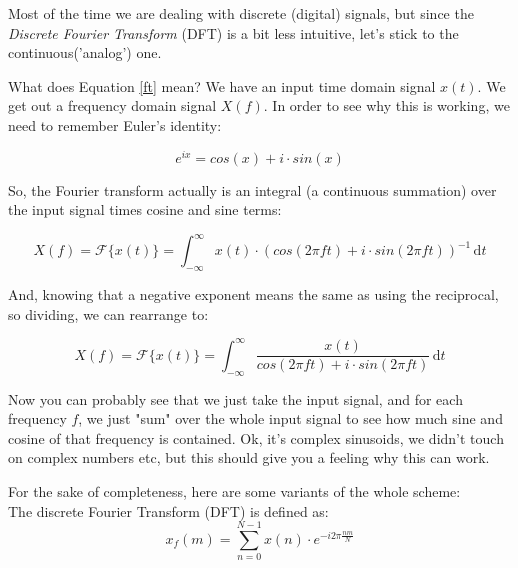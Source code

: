 Most of the time we are dealing with discrete (digital) signals, but since the  \textit{Discrete Fourier Transform} (DFT) is a bit less intuitive, let's stick to the continuous('analog') one.


What does Equation \ref{ft} mean? We have an input time domain signal $x(t)$. We get out a frequency domain signal $X(f)$. In order to see why this is working, we need to remember Euler's identity:

\begin{equation}
	e ^{ix} = cos(x)+i \cdot sin(x)
\end{equation}

So, the Fourier transform actually is an integral (a continuous summation) over the input signal times cosine and sine terms:


\begin{equation}
	X(f)= \mathcal{F} \{x(t)\} = \int_{-\infty}^\infty \! x(t) \cdot (cos(2\pi ft)+i \cdot sin(2\pi ft) )^{-1}  \, \mathrm{d}t
	\label{ft2}
\end{equation}

And, knowing that a negative exponent means the same as using the reciprocal, so dividing, we can rearrange to:


\begin{equation}
	X(f)= \mathcal{F} \{x(t)\} = \int_{-\infty}^\infty \! \frac{x(t)} { cos(2\pi ft)+i \cdot sin(2\pi ft) }  \, \mathrm{d}t
	\label{ft2}
\end{equation}

Now you can probably see that we just take the input signal, and for each frequency $f$, we just "sum" over the whole input signal to see how much sine and cosine of that frequency is contained. Ok, it's complex sinusoids, we didn't touch on complex numbers etc, but this should give you a feeling why this can work.



For the sake of completeness, here are some variants of the whole scheme:\\
The discrete Fourier Transform (DFT) is defined as:
\begin{equation}
	x_f(m) = \sum_{n=0}^{N-1} x(n)\cdot e^{-i 2 \pi \frac{n m}{N} }
	\label{eq:dft}
\end{equation}


